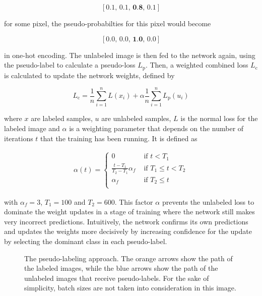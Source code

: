 \[ [0.1,\, 0.1,\, \textbf{0.8},\, 0.1] \]

\noindent for some pixel, the pseudo-probabilties for this pixel would become

\[ [0.0,\, 0.0,\, \textbf{1.0},\, 0.0] \]

\noindent in one-hot encoding. The unlabeled image is then fed to the network again, using the pseudo-label to calculate a pseudo-loss $L_\text{p}$. Then, a weighted combined loss $L_\text{c}$ is calculated to update the network weights, defined by

\[ L_\text{c} = \frac{1}{n} \sum \limits_{i=1}^{n} L(x_i) + \alpha \frac{1}{n} \sum \limits_{i=1}^{n} L_\text{p}(u_i)  \]

\noindent where $x$ are labeled samples, $u$ are unlabeled samples, $L$ is the normal loss for the labeled image and $\alpha$ is a weighting parameter that depends on the number of iterations $t$ that the training has been running. It is defined as

\begin {align}
\alpha(t) = \begin{cases} 0 &\text{ if } t < T_1 \\
				\frac{t - T_1}{T_2 - T_1} \alpha_f &\text{ if } T_1 \leq t < T_2 \\
				\alpha_f &\text { if } T_2 \leq t \\
	        \end{cases}
\end {align}

\noindent with $\alpha_f = 3$, $T_1 = 100$ and $T_2 = 600$. This factor $\alpha$ prevents the unlabeled loss to dominate the weight updates in a stage of training where the network still makes very incorrect predictions. Intuitively, the network confirms its own predictions and updates the weights more decisively by increasing confidence for the update by selecting the dominant class in each pseudo-label.\\

\begin {figure}[!htb]
	\begin{center}
		\scalebox{0.45}{}
	\end{center}

		\caption[Pseudo-Labeling.]{The pseudo-labeling approach. The orange arrows show the path of the labeled images, while the blue arrows show the path of the unlabeled images that receive pseudo-labels. For the sake of simplicity, batch sizes are not taken into consideration in this image.}
		\label{fig:pseudo_label}
\end {figure}

